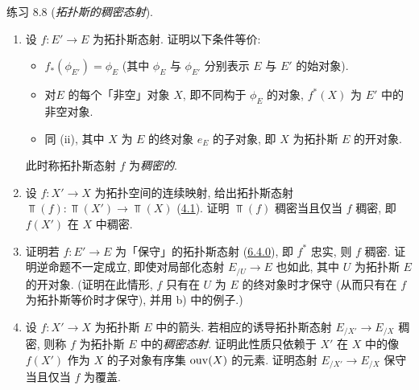 \begin{enonce*}[remark]{练习 8.8}
(\emph{拓扑斯的稠密态射}).
\begin{enumerate}
\renewcommand{\theenumi}{\alph{enumi}}
\renewcommand{\labelenumi}{\theenumi)}
\item 设 $f:E'\rightarrow E$ 为拓扑斯态射. 证明以下条件等价:

\begin{itemize}
\item[(i)] $f_{\ast}(\phi_{E'})=\phi_E$ (其中 $\phi_E$ 与 $\phi_{E'}$ 分别表示 $E$ 与 $E'$ 的始对象).

\item[(ii)] 对\pageoriginale $E$ 的每个「非空」对象 $X$, 即不同构于 $\phi_E$ 的对象, $f^{\ast}(X)$ 为 $E'$ 中的非空对象.

\item[$\rm(ii')$] 同 (ii), 其中 $X$ 为 $E$ 的终对象 $e_E$ 的子对象, 即 $X$ 为拓扑斯 $E$ 的开对象.
\end{itemize}

此时称拓扑斯态射 $f$ 为\emph{稠密的}.

\item 设 $f:X'\rightarrow X$ 为拓扑空间的连续映射, 给出拓扑斯态射 $\Top(f):\Top(X')\rightarrow\Top(X)$ (\hyperref[IV.subsec4.1]{4.1}). 证明 $\Top(f)$ 稠密当且仅当 $f$ 稠密, 即 $f(X')$ 在 $X$ 中稠密.

\item 证明若 $f:E'\rightarrow E$ 为「保守」的拓扑斯态射 (\hyperref[IV.subsubsec6.4.0]{6.4.0}), 即 $f^{\ast}$ 忠实, 则 $f$ 稠密. 证明逆命题不一定成立, 即使对局部化态射 $E_{/U}\rightarrow E$ 也如此, 其中 $U$ 为拓扑斯 $E$ 的开对象. (证明在此情形, $f$ 只有在 $U$ 为 $E$ 的终对象时才保守 (从而只有在 $f$ 为拓扑斯等价时才保守), 并用 b) 中的例子.)

\item 设 $f:X'\rightarrow X$ 为拓扑斯 $E$ 中的箭头. 若相应的诱导拓扑斯态射 $E_{/X'}\rightarrow E_{/X}$  稠密, 则称 $f$ 为拓扑斯 $E$ 中的\emph{稠密态射}. 证明此性质只依赖于 $X'$ 在 $X$ 中的像 $f(X')$ 作为 $X$ 的子对象有序集 $\operatorname{ouv}(X)$ 的元素. 证明态射 $E_{/X'}\rightarrow E_{/X}$ 保守当且仅当 $f$ 为覆盖.
\end{enumerate}
\end{enonce*}



